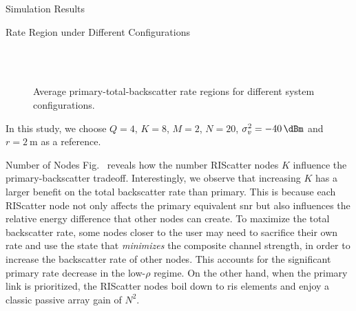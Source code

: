 \documentclass[journal]{IEEEtran}
\begin{document}
\begin{section}{Simulation Results}
	\begin{subsection}{Rate Region under Different Configurations}
		\begin{figure}[!t]
			\centering
			\\
			\\
			\caption{
				Average primary-total-backscatter rate regions for different system configurations.
			}
			\label{fg:region_config}
		\end{figure}
		In this study, we choose $Q=4$, $K=8$, $M=2$, $N=20$, $\sigma_v^2=\qty{-40}{\dBm}$ and $r=\qty{2}{\meter}$ as a reference.
		\begin{subsubsection}{Number of Nodes}
			Fig.~ reveals how the number RIScatter nodes $K$ influence the primary-backscatter tradeoff.
			Interestingly, we observe that increasing $K$ has a larger benefit on the total backscatter rate than primary.
			This is because each RIScatter node not only affects the primary equivalent \gls{snr} but also influences the relative energy difference that other nodes can create.
			To maximize the total backscatter rate, some nodes closer to the user may need to sacrifice their own rate and use the state that \emph{minimizes} the composite channel strength, in order to increase the backscatter rate of other nodes.
			This accounts for the significant primary rate decrease in the low-$\rho$ regime.
			On the other hand, when the primary link is prioritized, the RIScatter nodes boil down to \gls{ris} elements and enjoy a classic passive array gain of $N^2$.
		\end{subsubsection}


\end{subsection}
\end{section}
\end{document}
